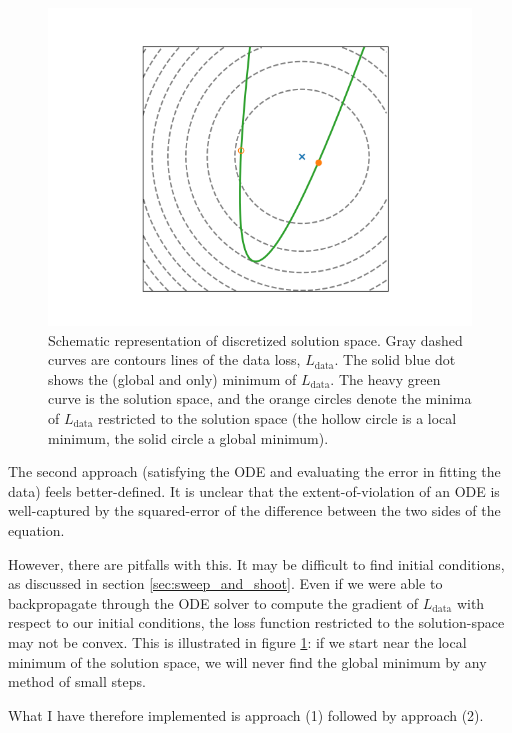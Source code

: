 \documentclass{article}
\begin{document}
\begin{figure}
\includegraphics{images/method/disc_space_viz.png}
\centering
\caption{
Schematic representation of discretized solution space.
Gray dashed curves are contours lines of the data loss, $L_{\mathrm{data}}$.
The solid blue dot shows the (global and only) minimum of $L_{\mathrm{data}}$.
The heavy green curve is the solution space, and the orange circles denote the minima of $L_{\mathrm{data}}$ restricted to the solution space (the hollow circle is a local minimum, the solid circle a global minimum).
}
\label{fig:disc_space_viz}
\end{figure}

The second approach (satisfying the ODE and evaluating the error in fitting the data) feels better-defined.
It is unclear that the extent-of-violation of an ODE is well-captured by the squared-error of the difference between the two sides of the equation.

However, there are pitfalls with this.
It may be difficult to find initial conditions, as discussed in section \ref{sec:sweep_and_shoot}.
Even if we were able to backpropagate through the ODE solver to compute the gradient of $L_{\mathrm{data}}$ with respect to our initial conditions, the loss function restricted to the solution-space may not be convex.
This is illustrated in figure \ref{fig:disc_space_viz}: if we start near the local minimum of the solution space, we will never find the global minimum by any method of small steps.

What I have therefore implemented is approach (1) followed by approach (2).
\end{document}
